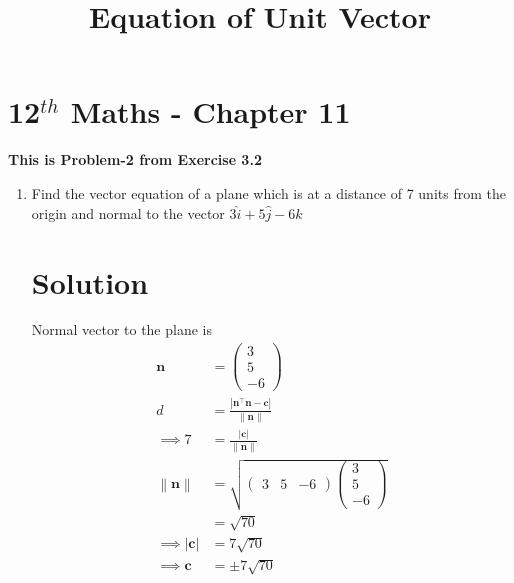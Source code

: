 \documentclass[12pt]{article}
\providecommand{\norm}[1]{\left\lVert#1\right\rVert}
\newcommand{\myvec}[1]{\ensuremath{\begin{pmatrix}#1\end{pmatrix}}}
\providecommand{\abs}[1]{\left\vert#1\right\vert}
\let\vec\mathbf
\begin{document}
\begin{center}
\title{\textbf{Equation  of Unit Vector}}
\date{\vspace{-5ex}} %
\maketitle
\end{center}
\setcounter{page}{1}
\section{12$^{th}$ Maths - Chapter 11}
\textbf{This is Problem-2 from Exercise 3.2}
\begin{enumerate}
\item Find the vector equation of a plane which is at a distance of 7 units from the origin and normal to the vector $3\hat{i}+5\hat{j}-6\hat{k}$
\section{Solution}
Normal vector to the plane is
\begin{align} 
\vec{n}&=\myvec{3\\5\\-6}\\
d&=\frac{\abs{\vec{n}^\top\vec{n}-\vec{c}}}{\norm{\vec{n}}}\\
\implies7&=\frac{\abs{\vec{c}}}{\norm{\vec{n}}}\\
\norm{\vec{n}}&=\sqrt{\myvec{3& 5& -6}\myvec{3\\5\\-6}}\\
&=\sqrt{70}\\
\implies\abs{\vec{c}}&=7\sqrt{70}\\
\implies\vec{c}&=\pm7\sqrt{70}
\end{align}	  
\end{enumerate} 
\end{document}
